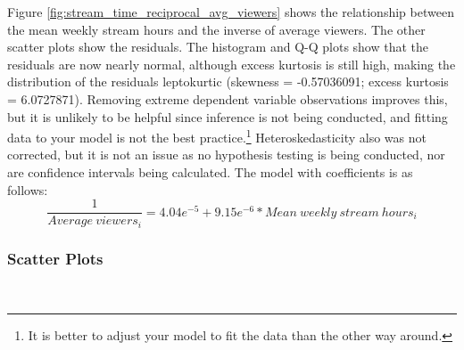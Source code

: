 \documentclass[12pt]{article}
\begin{document}

Figure \ref{fig:stream_time_reciprocal_avg_viewers} shows the relationship between the mean weekly stream hours and the inverse of average viewers. The other scatter plots show the residuals. The histogram and Q-Q plots show that the residuals are now nearly normal, although excess kurtosis is still high, making the distribution of the residuals leptokurtic (skewness = -0.57036091; excess kurtosis = 6.0727871). Removing extreme dependent variable observations improves this, but it is unlikely to be helpful since inference is not being conducted, and fitting data to your model is not the best practice.\footnote{It is better to adjust your model to fit the data than the other way around.} Heteroskedasticity also was not corrected, but it is not an issue as no hypothesis testing is being conducted, nor are confidence intervals being calculated. The model with coefficients is as follows:
\begin{equation}
 \dfrac{1}{Average\ viewers_{i}} = 4.04e^{-5} + 9.15e^{-6} \ast Mean\ weekly\ stream\ hours_{i} \label{eq:reciprocal_model_w_coef}
\end{equation}

\subsubsection{Scatter Plots}\
\end{document}
